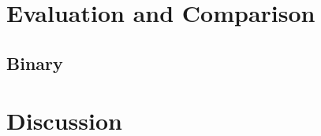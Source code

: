 \documentclass[12pt]{article}
\begin{document}
\section{Evaluation and Comparison}

\subsection{Binary}

%

\section{Discussion}



\end{document}
